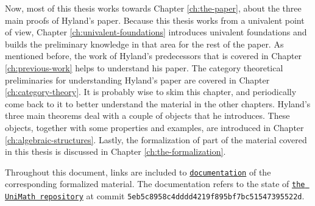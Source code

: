 Now, most of this thesis works towards Chapter \ref{ch:the-paper}, about the three main proofs of Hyland's paper.
Because this thesis works from a univalent point of view, Chapter \ref{ch:univalent-foundations} introduces univalent foundations and builds the preliminary knowledge in that area for the rest of the paper.
As mentioned before, the work of Hyland's predecessors that is covered in Chapter \ref{ch:previous-work} helps to understand his paper.
The category theoretical preliminaries for understanding Hyland's paper are covered in Chapter \ref{ch:category-theory}. It is probably wise to skim this chapter, and periodically come back to it to better understand the material in the other chapters.
Hyland's three main theorems deal with a couple of objects that he introduces. These objects, together with some properties and examples, are introduced in Chapter \ref{ch:algebraic-structures}.
Lastly, the formalization of part of the material covered in this thesis is discussed in Chapter \ref{ch:the-formalization}.

Throughout this document, links are included to \href{https://arnoudvanderleer.github.io/cs-masters-thesis/toc.html}{\nolinkurl{documentation}} of the corresponding formalized material. The documentation refers to the state of \href{https://github.com/UniMath/UniMath/tree/5eb5c8958c4dddd4219f895bf7bc51547395522d}{\texttt{the UniMath repository}} at commit \texttt{5eb5c8958c4dddd4219f895bf7bc51547395522d}.
